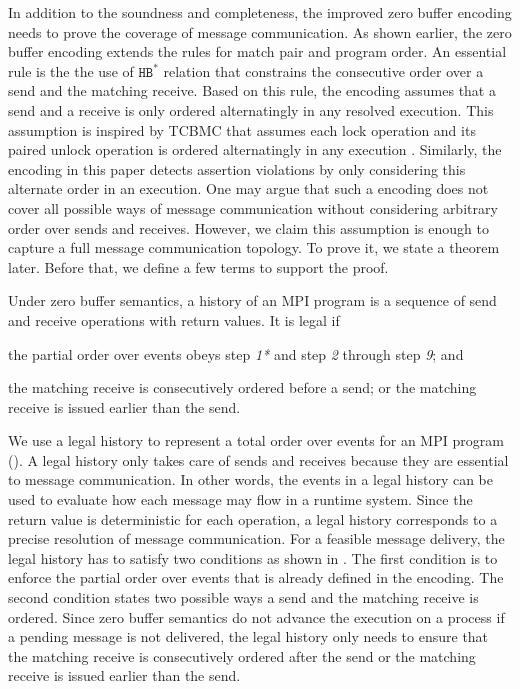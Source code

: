 In addition to the soundness and completeness, the improved zero buffer encoding needs to prove the coverage of message communication. As shown earlier, the zero buffer encoding extends the rules for match pair and program order. An essential rule is the the use of $\mathtt{HB^*}$ relation that constrains the consecutive order over a send and the matching receive. Based on this rule, the encoding assumes that a send and a receive is only ordered alternatingly in any resolved execution. This assumption is inspired by TCBMC that assumes each lock operation and its paired unlock operation is ordered alternatingly in any execution \cite{DBLP:conf/cav/RabinovitzG05}. Similarly, the encoding in this paper detects assertion violations by only considering this alternate order in an execution. One may argue that such a encoding does not cover all possible ways of message communication without considering arbitrary order over sends and receives. However, we claim this assumption is enough to capture a full message communication topology. To prove it, we state a theorem later.  Before that, we define a few terms to support the proof.

\begin{definition}\label{def:legal}
Under zero buffer semantics, a history of an MPI program is a sequence of send and receive operations with return values. It is legal if
\begin{compactenum}
\item the partial order over events obeys step \textit{1*} and step \textit{2} through step \textit{9}; and 
\item the matching receive is consecutively ordered before a send; or the matching receive is issued earlier than the send.
\end{compactenum}
\end{definition}

We use a legal history to represent a total order over events for an MPI program (). A legal history only takes care of sends and receives because they are essential to message communication. In other words, the events in a legal history can be used to evaluate how each message may flow in a runtime system. Since the return value is deterministic for each operation, a legal history corresponds to a precise resolution of message communication. For a feasible message delivery, the legal history has to satisfy two conditions as shown in . The first condition is to enforce the partial order over events that is already defined in the encoding. The second condition states two possible ways a send and the matching receive is ordered. Since zero buffer semantics do not advance the execution on a process if a pending message is not delivered, the legal history only needs to ensure that the matching receive is consecutively ordered after the send or the matching receive is issued earlier than the send. 

